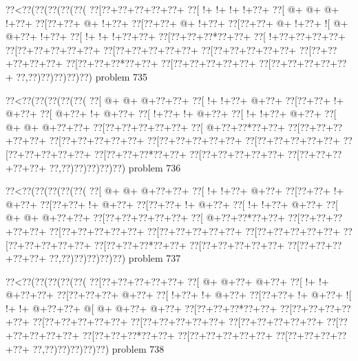 \vbox{\vbox{\goo
\0??<\0??(\0??(\0??(\0??(\0??(
\0??[\0??+\0??+\0??+\0??+\0??+
\0??[\- !+\- !+\- !+\- !+\0??+
\0??[\- @+\- @+\- @+\- !+\0??+
\0??[\0??+\0??+\- @+\- !+\0??+
\0??[\0??+\0??+\- @+\- !+\0??+
\0??[\0??+\0??+\- @+\- !+\0??+
\- ![\- @+\- @+\0??+\- !+\0??+
\0??[\- !+\- !+\- !+\0??+\0??+
\0??[\0??+\0??+\0??*\0??+\0??+
\0??[\- !+\0??+\0??+\0??+\0??+
\0??[\0??+\0??+\0??+\0??+\0??+
\0??[\0??+\0??+\0??+\0??+\0??+
\0??[\0??+\0??+\0??+\0??+\0??+
\0??[\0??+\0??+\0??+\0??+\0??+
\0??[\0??+\0??+\0??*\0??+\0??+
\0??[\0??+\0??+\0??+\0??+\0??+
\0??[\0??+\0??+\0??+\0??+\0??+
\0??,\0??)\0??)\0??)\0??)\0??)
}
\hfil problem 735\hfil\break
}

\vbox{\vbox{\goo
\0??<\0??(\0??(\0??(\0??(\0??(
\0??[\- @+\- @+\- @+\0??+\0??+
\0??[\- !+\- !+\0??+\- @+\0??+
\0??[\0??+\0??+\- !+\- @+\0??+
\0??[\- @+\0??+\- !+\- @+\0??+
\0??[\- !+\0??+\- !+\- @+\0??+
\0??[\- !+\- !+\0??+\- @+\0??+
\0??[\- @+\- @+\- @+\0??+\0??+
\0??[\0??+\0??+\0??+\0??+\0??+
\0??[\- @+\0??+\0??*\0??+\0??+
\0??[\0??+\0??+\0??+\0??+\0??+
\0??[\0??+\0??+\0??+\0??+\0??+
\0??[\0??+\0??+\0??+\0??+\0??+
\0??[\0??+\0??+\0??+\0??+\0??+
\0??[\0??+\0??+\0??+\0??+\0??+
\0??[\0??+\0??+\0??*\0??+\0??+
\0??[\0??+\0??+\0??+\0??+\0??+
\0??[\0??+\0??+\0??+\0??+\0??+
\0??,\0??)\0??)\0??)\0??)\0??)
}
\hfil problem 736\hfil\break
}

\vbox{\vbox{\goo
\0??<\0??(\0??(\0??(\0??(\0??(
\0??[\- @+\- @+\- @+\0??+\0??+
\0??[\- !+\- !+\0??+\- @+\0??+
\0??[\0??+\0??+\- !+\- @+\0??+
\0??[\0??+\0??+\- !+\- @+\0??+
\0??[\0??+\0??+\- !+\- @+\0??+
\0??[\- !+\- !+\0??+\- @+\0??+
\0??[\- @+\- @+\- @+\0??+\0??+
\0??[\0??+\0??+\0??+\0??+\0??+
\0??[\- @+\0??+\0??*\0??+\0??+
\0??[\0??+\0??+\0??+\0??+\0??+
\0??[\0??+\0??+\0??+\0??+\0??+
\0??[\0??+\0??+\0??+\0??+\0??+
\0??[\0??+\0??+\0??+\0??+\0??+
\0??[\0??+\0??+\0??+\0??+\0??+
\0??[\0??+\0??+\0??*\0??+\0??+
\0??[\0??+\0??+\0??+\0??+\0??+
\0??[\0??+\0??+\0??+\0??+\0??+
\0??,\0??)\0??)\0??)\0??)\0??)
}
\hfil problem 737\hfil\break
}

\vbox{\vbox{\goo
\0??<\0??(\0??(\0??(\0??(\0??(
\0??[\0??+\0??+\0??+\0??+\0??+
\0??[\- @+\- @+\0??+\- @+\0??+
\0??[\- !+\- !+\- @+\0??+\0??+
\0??[\0??+\0??+\0??+\- @+\0??+
\0??[\- !+\0??+\- !+\- @+\0??+
\0??[\0??+\0??+\- !+\- @+\0??+
\- ![\- !+\- !+\- @+\0??+\0??+
\- @[\- @+\- @+\0??+\- @+\0??+
\0??[\0??+\0??+\0??*\0??+\0??+
\0??[\0??+\0??+\0??+\0??+\0??+
\0??[\0??+\0??+\0??+\0??+\0??+
\0??[\0??+\0??+\0??+\0??+\0??+
\0??[\0??+\0??+\0??+\0??+\0??+
\0??[\0??+\0??+\0??+\0??+\0??+
\0??[\0??+\0??+\0??*\0??+\0??+
\0??[\0??+\0??+\0??+\0??+\0??+
\0??[\0??+\0??+\0??+\0??+\0??+
\0??,\0??)\0??)\0??)\0??)\0??)
}
\hfil problem 738\hfil\break
}

